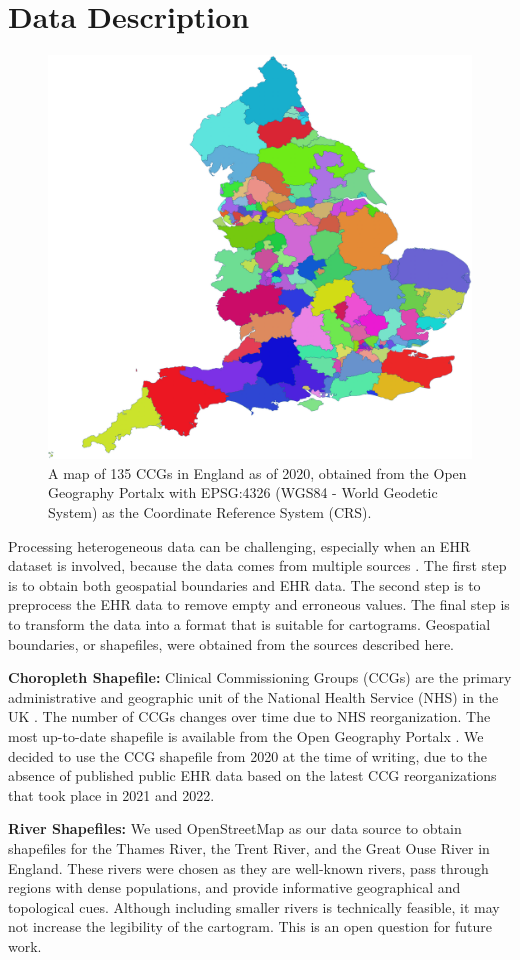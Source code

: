 \documentclass[Afour,sagev,times]{sagej}
\newcommand{\bobgraph}[1]{\noindent\textbf{#1}}
\begin{document}
\section{Data Description}

 {
  \begin{figure}[b!]
      \centering
      \includegraphics[width=0.6\columnwidth]{ccg.png}
      \caption{A map of 135 CCGs in England as of 2020, obtained from the Open Geography Portalx \cite{opengeographyportalxOpen} with EPSG:4326 (WGS84 - World Geodetic System) as the Coordinate Reference System (CRS).}
      \label{fig:ccg}
  \end{figure}
 }

Processing heterogeneous data can be challenging, especially when an EHR dataset is involved, because the data comes from multiple sources \cite{wang2021EHR}.
The first step is to obtain both geospatial boundaries and EHR data.
The second step is to preprocess the EHR data to remove empty and erroneous values.
The final step is to transform the data into a format that is suitable for cartograms.
Geospatial boundaries, or shapefiles, were obtained from the sources described here.

\bobgraph{Choropleth Shapefile:} Clinical Commissioning Groups (CCGs) are the primary administrative and geographic unit of the National Health Service (NHS) in the UK \cite{nhsNHS}.
The number of CCGs changes over time due to NHS reorganization.
The most up-to-date shapefile is available from the Open Geography Portalx \cite{opengeographyportalxOpen}.
We decided to use the CCG shapefile from 2020 at the time of writing, due to the absence of published public EHR data based on the latest CCG reorganizations that took place in 2021 and 2022.

\bobgraph{River Shapefiles:} We used OpenStreetMap \cite{openstreetmapRelation} as our data source to obtain shapefiles for the Thames River, the Trent River, and the Great Ouse River in England.
These rivers were chosen as they are well-known rivers, pass through regions with dense populations, and provide informative geographical and topological cues.
Although including smaller rivers is technically feasible, it may not increase the legibility of the cartogram.
This is an open question for future work.
\end{document}
